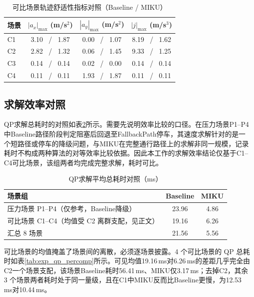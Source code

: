 \documentclass[a4paper,11pt]{ctexart}
\theoremstyle{definition}
\begin{document}
\begin{table}[htbp]
\centering
\caption{可比场景轨迹舒适性指标对照（Baseline / MIKU）}
\label{tab:exp_comfort}
\small
\begin{tabular}{lccc}
\toprule
\textbf{场景} & \textbf{$|a_x|_{\max}$ (m/s$^2$)} & \textbf{$|a_y|_{\max}$ (m/s$^2$)} & \textbf{$|j|_{\max}$ (m/s$^3$)} \\
\midrule
C1 & 3.10 \ / \ 1.87 & 0.00 \ / \ 1.07 & 8.19 \ / \ 1.62 \\
C2 & 2.82 \ / \ 1.32 & 0.06 \ / \ 1.45 & 9.33 \ / \ 1.25 \\
C3 & 0.14 \ / \ 0.14 & 0.02 \ / \ 0.00 & 0.14 \ / \ 0.14 \\
C4 & 0.11 \ / \ 0.11 & 1.93 \ / \ 1.87 & 0.11 \ / \ 0.11 \\
\bottomrule
\end{tabular}
\end{table}

\subsection{求解效率对照}
\label{subsec:exp_qp}

QP求解总耗时的对照如表\ref{tab:exp_qp}所示。需要先说明效率比较的口径。在压力场景P1--P4中Baseline路径阶段判定阻塞后回退至FallbackPath停车，其速度求解针对的是一个短路径或停车的降级问题，与MIKU在完整通行路径上的求解非同一规模，记录耗时不构成两种算法的对等效率比较依据。因此本工作的求解效率结论仅基于C1--C4可比场景，该组两者均完成完整求解，耗时可比。

\begin{table}[htbp]
\centering
\caption{QP求解平均总耗时对照（ms）}
\label{tab:exp_qp}
\small
\begin{tabular}{lcc}
\toprule
\textbf{场景组} & \textbf{Baseline} & \textbf{MIKU} \\
\midrule
压力场景 P1--P4（仅参考，Baseline降级） & 23.96 & 4.86 \\
可比场景 C1--C4（均值受 C2 离群支配，见正文） & 19.16 & 6.26 \\
\midrule
汇总 8 场景 & 21.56 & 5.56 \\
\bottomrule
\end{tabular}
\end{table}

可比场景的均值掩盖了场景间的离散，必须逐场景披露。4 个可比场景的 QP 总耗时如表\ref{tab:exp_qp_percomp}所示。可见均值19.16\,ms对6.26\,ms的差距几乎完全由C2一个场景支配，该场景Baseline耗时56.41\,ms、MIKU仅3.17\,ms；去掉C2，其余 3 个场景两者耗时处于同一量级，且在C1中MIKU反而比Baseline更慢，为12.53\,ms对10.44\,ms。
\end{document}
